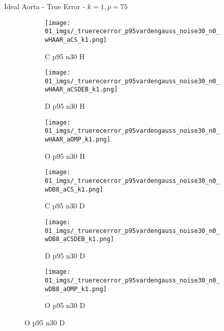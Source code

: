 \begin{frame}{Ideal Aorta - True Error - $k=1,p=75$}{}
\begin{figure}
\begin{subfigure}{0.13\textwidth}
\texttt{[image: 01\_imgs/\_truerecerror\_p95vardengauss\_noise30\_n0\_wHAAR\_aCS\_k1.png]}
\caption*{\tiny C p95 n30 H}
\end{subfigure}
\begin{subfigure}{0.13\textwidth}
\texttt{[image: 01\_imgs/\_truerecerror\_p95vardengauss\_noise30\_n0\_wHAAR\_aCSDEB\_k1.png]}
\caption*{\tiny D p95 n30 H}
\end{subfigure}
\begin{subfigure}{0.13\textwidth}
\texttt{[image: 01\_imgs/\_truerecerror\_p95vardengauss\_noise30\_n0\_wHAAR\_aOMP\_k1.png]}
\caption*{\tiny O p95 n30 H}
\end{subfigure}
\begin{subfigure}{0.13\textwidth}
\texttt{[image: 01\_imgs/\_truerecerror\_p95vardengauss\_noise30\_n0\_wDB8\_aCS\_k1.png]}
\caption*{\tiny C p95 n30 D}
\end{subfigure}
\begin{subfigure}{0.13\textwidth}
\texttt{[image: 01\_imgs/\_truerecerror\_p95vardengauss\_noise30\_n0\_wDB8\_aCSDEB\_k1.png]}
\caption*{\tiny D p95 n30 D}
\end{subfigure}
\begin{subfigure}{0.13\textwidth}
\texttt{[image: 01\_imgs/\_truerecerror\_p95vardengauss\_noise30\_n0\_wDB8\_aOMP\_k1.png]}
\caption*{\tiny O p95 n30 D}
\end{subfigure}
\end{figure}
\end{frame}
